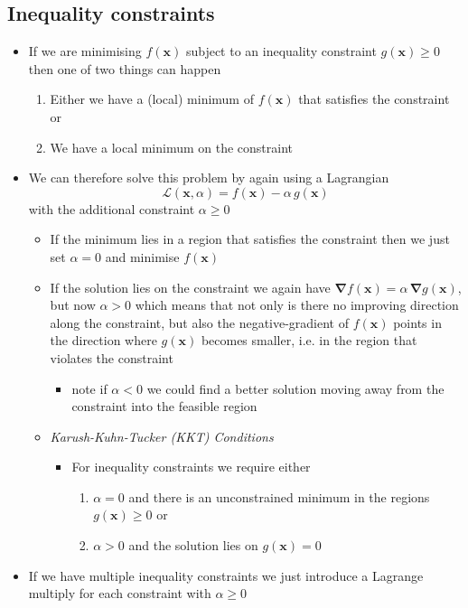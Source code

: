 \documentclass[11pt]{article}
\newcommand{\grad}{\bm{\nabla}}
\begin{document}
\subsection{Inequality constraints}
\label{sec:org609c360}
\begin{itemize}
\item If we are minimising \(f(\bm{x})\) subject to an inequality
constraint \(g(\bm{x})\geq0\) then one of two things can happen
\begin{enumerate}
\item Either we have a (local) minimum of \(f(\bm{x})\) that satisfies
the constraint or
\item We have a local minimum on the constraint
\end{enumerate}
\item We can therefore solve this problem by again using a Lagrangian
$$ \mathcal{L}(\bm{x},\alpha) = f(\bm{x}) - \alpha\,g(\bm{x}) $$
with the additional constraint \(\alpha\geq0\)
\begin{itemize}
\item If the minimum lies in a region that satisfies the constraint
then we just set \(\alpha=0\) and minimise \(f(\bm{x})\)
\item If the solution lies on the constraint we again have  \(\grad
       f(\bm{x}) = \alpha\,\grad g(\bm{x})\), but now \(\alpha>0\) which
means that not only is there no improving direction along the
constraint, but also the negative-gradient of \(f(\bm{x})\)
points in the direction where \(g(\bm{x})\) becomes smaller,
i.e. in the region that violates the constraint
\begin{itemize}
\item note if \(\alpha<0\) we could find a better solution moving
away from the constraint into the feasible region
\end{itemize}
\item \emph{Karush-Kuhn-Tucker (KKT) Conditions}
\begin{itemize}
\item For inequality constraints we require either
\begin{enumerate}
\item \(\alpha=0\) and there is an unconstrained minimum in the
regions \(g(\bm{x})\geq0\) or
\item \(\alpha>0\) and the solution lies on \(g(\bm{x})=0\)
\end{enumerate}
\end{itemize}
\end{itemize}
\item If we have multiple inequality constraints we just introduce a
Lagrange multiply for each constraint with \(\alpha\geq0\)
\end{itemize}
\end{document}
